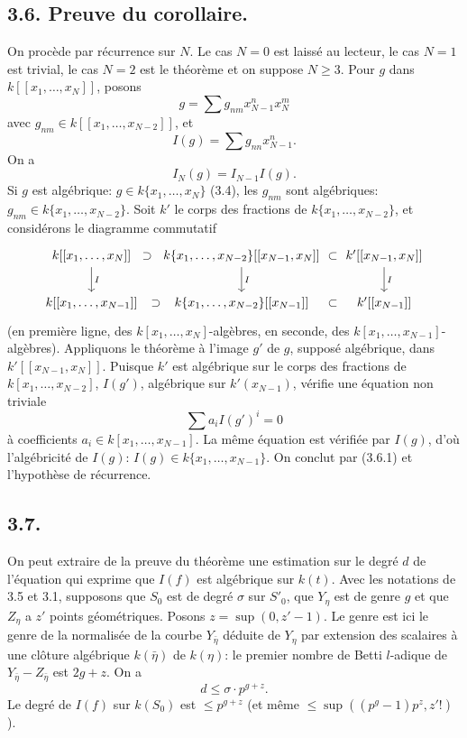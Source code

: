 \documentclass[11pt,leqno]{article}
\begin{document}
\subsection*{3.6. Preuve du corollaire.}
On procède par récurrence sur $N$. Le cas $N=0$ est laissé au lecteur, le cas $N=1$ est trivial, le cas $N=2$ est le théorème et on suppose $N\ge3$. Pour $g$ dans $k[[x_1,\ldots,x_N]]$, posons
\[
        g=\sum g_{nm}x_{N-1}^n x_N^m
\]
avec $g_{nm}\in k[[x_1,\ldots,x_{N-2}]]$, et
\[
        I(g)=\sum g_{nn}x_{N-1}^n.
\]
On a
\begin{equation}
        I_N(g)=I_{N-1}I(g). \tag{3.6.1}
\end{equation}
Si $g$ est algébrique: $g\in k\{x_1,\ldots,x_N\}$ (3.4), les $g_{nm}$ sont algébriques: $g_{nm}\in k\{x_1,\ldots,x_{N-2}\}$. Soit $k'$ le corps des fractions de $k\{x_1,\ldots,x_{N-2}\}$, et considérons le diagramme commutatif
\[
\begin{tikzcd}[column sep=1.2em,row sep=2em]
k[[x_1,\ldots,x_N]] \arrow[r,phantom,"\supset"] \arrow[d,"I"] &
k\{x_1,\ldots,x_{N-2}\}[[x_{N-1},x_N]] \arrow[r,phantom,"\subset"] \arrow[d,"I"] &
k'[[x_{N-1},x_N]] \arrow[d,"I"] \\
k[[x_1,\ldots,x_{N-1}]] \arrow[r,phantom,"\supset"] &
k\{x_1,\ldots,x_{N-2}\}[[x_{N-1}]] \arrow[r,phantom,"\subset"] & k'[[x_{N-1}]]
\end{tikzcd}
\]
(en première ligne, des $k[x_1,\ldots,x_N]$-algèbres, en seconde, des $k[x_1,\ldots,x_{N-1}]$-algèbres). Appliquons le théorème à l'image $g'$ de $g$, supposé algébrique, dans $k'[[x_{N-1},x_N]]$. Puisque $k'$ est algébrique sur le corps des fractions de
\clearpage
$k[x_1,\ldots,x_{N-2}]$, $I(g')$, algébrique sur $k'(x_{N-1})$, vérifie une équation non triviale
\[
        \sum a_iI(g')^i=0
\]
à coefficients $a_i\in k[x_1,\ldots,x_{N-1}]$. La même équation est vérifiée par $I(g)$, d'où l'algébricité de $I(g)$: $I(g)\in k\{x_1,\ldots,x_{N-1}\}$. On conclut par (3.6.1) et l'hypothèse de récurrence.

\subsection*{3.7.}
On peut extraire de la preuve du théorème une estimation sur le degré $d$ de l'équation qui exprime que $I(f)$ est algébrique sur $k(t)$. Avec les notations de 3.5 et 3.1, supposons que $S_0$ est de degré $\sigma$ sur $S'_0$, que $Y_\eta$ est de genre $g$ et que $Z_\eta$ a $z'$ points géométriques. Posons $z=\sup(0,z'-1)$. Le genre est ici le genre de la normalisée de la courbe $Y_{\bar\eta}$ déduite de $Y_\eta$ par extension des scalaires à une clôture algébrique $k(\bar\eta)$ de $k(\eta)$: le premier nombre de Betti $l$-adique de $Y_{\bar\eta}-Z_{\bar\eta}$ est $2g+z$. On a
\begin{equation}
        d\le\sigma\cdot p^{g+z}. \tag{3.7.1}
\end{equation}
Le degré de $I(f)$ sur $k(S_0)$ est $\le p^{g+z}$ (et même $\le\sup((p^g-1)p^z,z'!)$).
\end{document}
